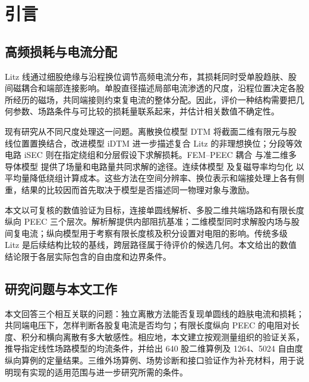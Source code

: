 \section{引言}
\label{chapter:01}

\hypertarget{01.introduction.heading}{}
\subsection{高频损耗与电流分配}

\hypertarget{01.introduction.p1}{}
Litz 线通过细股绝缘与沿程换位调节高频电流分布，其损耗同时受单股趋肤、股间磁耦合和端部连接影响。单股直径描述局部电流渗透的尺度，沿程位置决定各股所经历的磁场，共同端接则约束复电流的整体分配。因此，评价一种结构需要把几何参数、场路条件与可比较的损耗量联系起来，并估计相关数值不确定性。

\hypertarget{01.introduction.p2}{}
现有研究从不同尺度处理这一问题。离散换位模型 DTM \cite{P01} 将截面二维有限元与股线位置置换结合，改进模型 iDTM \cite{N01} 进一步描述复合 Litz 的非理想换位；分段等效电路 iSEC \cite{P02} 则在指定绕组和分层假设下求解损耗。FEM–PEEC 耦合 \cite{P03} 与准二维多导体模型 \cite{P04} 提供了场量和电路量共同求解的途径。连续体模型 \cite{P05} 及复磁导率均匀化 \cite{P09} 以平均量降低绕组计算成本。这些方法在空间分辨率、换位表示和端接处理上各有侧重，结果的比较因而首先取决于模型是否描述同一物理对象与激励。

\hypertarget{01.introduction.p3}{}
本文以可复核的数值验证为目标，连接单圆线解析、多股二维共端场路和有限长度纵向 PEEC 三个层次。解析解提供内部阻抗基准；二维模型同时求解股内场与股间复电流；纵向模型用于考察有限长度核及积分设置对电阻的影响。传统多级 Litz 是后续结构比较的基线，跨层路径属于待评价的候选几何。本文给出的数值结论限于各层实际包含的自由度和边界条件。

\hypertarget{01.scope.heading}{}
\subsection{研究问题与本文工作}

\hypertarget{01.scope.p1}{}
本文回答三个相互关联的问题：独立离散方法能否复现单圆线的趋肤电流和损耗；共同端电压下，怎样判断各股复电流是否均匀；有限长度纵向 PEEC 的电阻对长度、积分和横向离散有多大敏感性。相应地，本文建立按观测量组织的验证关系，推导指定线性场路模型的均流条件，并给出 640 股二维算例及 1264、5024 自由度纵向算例的定量结果。三维外场算例、场势诊断和接口验证作为补充材料，用于说明现有实现的适用范围与进一步研究所需的条件。
